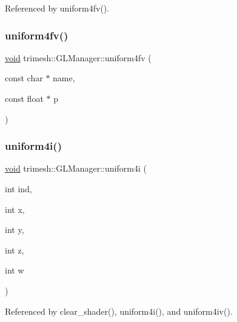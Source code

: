 Referenced by uniform4fv().

\mbox{\label{classtrimesh_1_1GLManager_a580fb27564991f2b7a3f5aea00a2aaa0}} 
\subsubsection{\texorpdfstring{uniform4fv()}{uniform4fv()}\hspace{0.1cm}{\footnotesize\ttfamily [2/2]}}
{\footnotesize\ttfamily \hyperlink{namespacetrimesh_a784ddfd979e1c579bda795a8edfc3f43}{void} trimesh\+::\+G\+L\+Manager\+::uniform4fv (\begin{DoxyParamCaption}\item[{const char $\ast$}]{name,  }\item[{const float $\ast$}]{p }\end{DoxyParamCaption})\hspace{0.3cm}{\ttfamily [inline]}}

\mbox{\label{classtrimesh_1_1GLManager_a0a82e153c475c4cfc102549efc258cf4}} 
\subsubsection{\texorpdfstring{uniform4i()}{uniform4i()}\hspace{0.1cm}{\footnotesize\ttfamily [1/2]}}
{\footnotesize\ttfamily \hyperlink{namespacetrimesh_a784ddfd979e1c579bda795a8edfc3f43}{void} trimesh\+::\+G\+L\+Manager\+::uniform4i (\begin{DoxyParamCaption}\item[{int}]{ind,  }\item[{int}]{x,  }\item[{int}]{y,  }\item[{int}]{z,  }\item[{int}]{w }\end{DoxyParamCaption})}



Referenced by clear\+\_\+shader(), uniform4i(), and uniform4iv().

\mbox{\label{classtrimesh_1_1GLManager_aaf1e9bb34b232537e042b538a98f6ea5}} 
